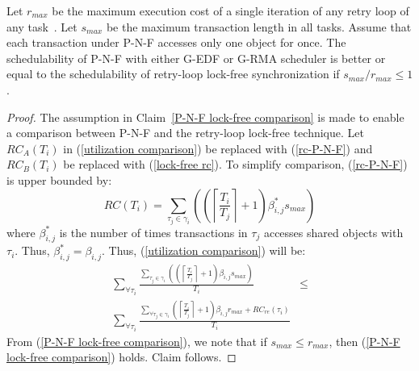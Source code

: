 \begin{clm}\label{P-N-F lock-free comparison}
Let $r_{max}$ be the maximum execution cost of a single iteration of any retry loop of any task~\cite{key-5}. Let $s_{max}$ be the maximum transaction length in all tasks. Assume that each transaction under P-N-F accesses only one object for once. The schedulability of P-N-F with either G-EDF or G-RMA scheduler is better or equal to the schedulability of retry-loop lock-free
synchronization if $s_{max}/r_{max}\le 1$.
\end{clm}
\begin{proof}
The assumption in Claim~\ref{P-N-F lock-free comparison} is made to enable a comparison between P-N-F and the retry-loop lock-free technique. Let $RC_{A}(T_{i})$ in (\ref{utilization comparison}) be replaced
with (\ref{rc-P-N-F}) and $RC_{B}(T_{i})$ be replaced with (\ref{lock-free rc}).
To simplify comparison, (\ref{rc-P-N-F}) is upper bounded by:
%
\begin{equation*}
RC(T_{i})=\sum_{\tau_{j}\in\gamma_{i}}\left(\left(\left\lceil \frac{T_{i}}{T_{j}}\right\rceil +1\right)\beta_{i,j}^* s_{max}\right)
\end{equation*}
%
where $\beta_{i,j}^*$ is the number of times transactions in $\tau_j$ accesses shared objects with $
\tau_i$. Thus, $\beta_{i,j}^* = \beta_{i,j}$. Thus, (\ref{utilization comparison}) will be:
\begin{eqnarray}
\sum_{\forall\tau_{i}}\frac{\sum_{\tau_{j}\in\gamma_{i}}\left(\left(\left\lceil \frac{T_{i}}{T_{j}}\right\rceil +1\right)\beta_{i,j}s_{max}\right)}{T_{i}} & \le\nonumber \\
\sum_{\forall\tau_{i}}\frac{\sum_{\forall\tau_{j}\in\gamma_{i}}\left(\left\lceil \frac{T_{i}}{T_{j}}\right\rceil +1\right)\beta_{i,j}r_{max}+RC_{re}(\tau_i)}{T_{i}}\label{P-N-F lock-free comparison}
\end{eqnarray}
From (\ref{P-N-F lock-free comparison}), we note that if $s_{max}\le r_{max}$,
then (\ref{P-N-F lock-free comparison}) holds. Claim follows.
\end{proof}